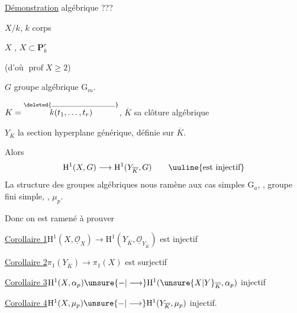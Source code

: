 
\uline{Démonstration} algébrique ???

\quad $X/k$, $k$ corps 

$X$  , $X\subset\mathbf{P}^r_k$

  (d'où $\operatorname{prof}X\geq2$)

$G$ groupe algébrique   $\mathrm{G}_m$.

$K=\overset{\deleted{\rule{2.7cm}{.3pt}}}{k(t_1,\ldots,t_r)}$, $\overline{K}$ sa clôture algébrique

$Y_{\overline{K}}$ la section hyperplane générique, définie sur $\overline{K}$.

Alors
\[
\mathrm{H}^1(X,G)\longrightarrow\mathrm{H}^1(Y_{\overline{K}},G)\qquad\uuline{\text{est injectif}}
\]
La structure des groupes algébriques  nous ramène aux cas simples $\mathrm{G}_a$, , groupe fini simple, , $\mu_p$.

Donc on est ramené à prouver

\uline{Corollaire 1}\quad $\mathrm{H}^1(X,\underline{\mathcal{O}}_X)\longrightarrow\mathrm{H}^1(Y_{\overline{K}},\underline{\mathcal{O}}_{Y_{\overline{K}}})$ est injectif



\uline{Corollaire 2}\quad $\pi_1(Y_{\overline{K}})\longrightarrow\pi_1(X)$ est surjectif

\uline{Corollaire 3}\quad $\mathrm{H}^1(X,\alpha_p)\unsure{{-}|\longrightarrow}\mathrm{H}^1(\unsure{X|Y}_{\overline{K}},\alpha_p)$ injectif

\uline{Corollaire 4}\quad $\mathrm{H}^1(X,\mu_p)\unsure{{-}|\longrightarrow}\mathrm{H}^1(Y_{\overline{K}},\mu_p)$ injectif.

